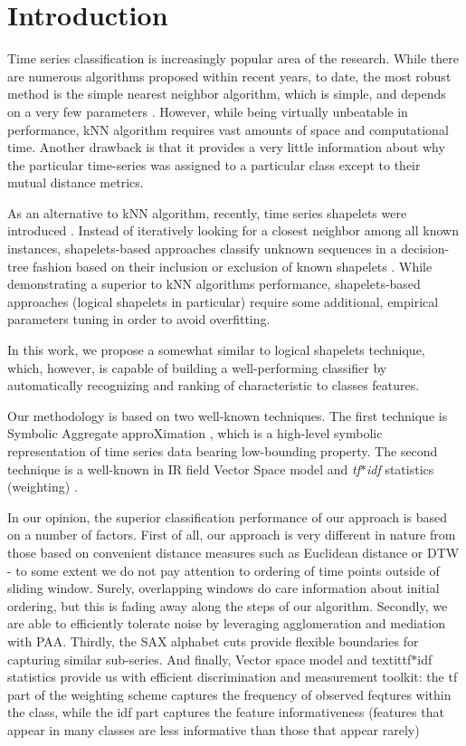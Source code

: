 \documentclass{llncs}
\begin{document}
\section{Introduction}
%
Time series classification is increasingly popular area of the research.
While there are numerous algorithms proposed within recent years, to date,
the most robust method is the simple nearest neighbor algorithm, 
which is simple, and depends on a very few parameters \cite{ed}. 
However, while being virtually unbeatable in performance, kNN algorithm 
requires vast amounts of space and computational time. 
Another drawback is that it provides a very little information about why 
the particular time-series was assigned to a particular class except to 
their mutual distance metrics.

As an alternative to kNN algorithm, recently, time series shapelets were
introduced \cite{shapelet}. Instead of iteratively looking for a closest neighbor
among all known instances, shapelets-based approaches classify unknown 
sequences in a decision-tree fashion based on their inclusion or exclusion 
of known shapelets \cite{logical}. 
While demonstrating a superior to kNN algorithms performance,
shapelets-based approaches (logical shapelets in particular) require some
additional, empirical parameters tuning in order to avoid overfitting.

In this work, we propose a somewhat similar to logical shapelets technique,
which, however, is capable of building a well-performing classifier by 
automatically recognizing and ranking of characteristic to classes features.

Our methodology is based on two well-known techniques. The first technique is Symbolic
Aggregate approXimation \cite{sax}, which is a high-level symbolic representation
of time series data bearing low-bounding property. The second technique is a well-known
in IR field Vector Space model and \textit{tf$\ast$idf} statistics (weighting) \cite{tfidf}.

In our opinion, the superior classification performance of our approach is based on 
a number of factors. 
First of all, our approach is very different in nature from those 
based on convenient distance measures such as Euclidean distance or DTW - to some 
extent we do not pay attention to ordering of time points outside of sliding window. 
Surely, overlapping windows do care information about initial ordering, but this 
is fading away along the steps of our algorithm.
Secondly, we are able to efficiently tolerate noise by leveraging agglomeration 
and mediation with PAA. 
Thirdly, the SAX alphabet cuts provide flexible boundaries for capturing similar 
sub-series. 
And finally, Vector space model and textit{tf$\ast$idf} statistics provide us 
with efficient discrimination and measurement toolkit: the tf part of the weighting scheme
captures the frequency of observed feqtures within the class, while the idf part 
captures the feature informativeness (features that appear in many classes 
are less informative than those that appear rarely)
\end{document}
